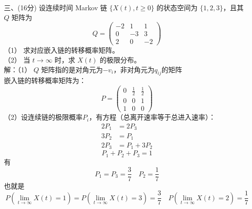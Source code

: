 \documentclass[UTF8,openany]{book}
\begin{document}
\noindent 三、(16分) 设连续时间 Markov 链 $\{X(t), t \geq 0\}$ 的状态空间为 $\{1,2,3\}$，且其 $Q$ 矩阵为
\[
Q = 
\begin{pmatrix}
	-2 & 1 & 1 \\
	0 & -3 & 3 \\
	2 & 0 & -2
\end{pmatrix}
\]
（1） 求对应嵌入链的转移概率矩阵。\\
（2） 当 $t \to \infty$ 时，求 $X(t)$ 的极限分布。\\
解：（1） $Q$ 矩阵指的是对角元为$-v_i$，非对角元为$q_{ij}$的矩阵\\
嵌入链的转移概率矩阵为：
\[
P=
\begin{pmatrix}
	0 & \frac{1}{2} & \frac{1}{2} \\
	0 & 0 & 1 \\
	1 & 0 & 0
\end{pmatrix}
\]
（2）设连续链的极限概率$P_i$，有方程（总离开速率等于总进入速率）：\\
$$
\begin{aligned}
	2P_1& =2P_3 \\
	3P_2 & =P_1\\
	2P_3&=P_1+3P_2
\end{aligned}
$$
\[
P_1+P_2+P_3=1
\]
有
\[
P_1=P_3=\frac{3}{7} \quad P_2=\frac{1}{7}
\]
也就是
\[
P(\lim_{t\rightarrow \infty} X(t)=1)=P(\lim_{t\rightarrow \infty} X(t)=3)=\frac{3}{7} \quad P(\lim_{t\rightarrow \infty} X(t)=2)=\frac{1}{7}
\]\\
\end{document}
